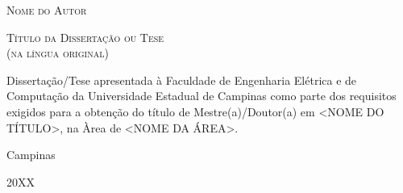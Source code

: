 \begin{center}

{\large\scshape Nome do Autor\par}

\vfill

{\large\scshape Título da Dissertação ou Tese\\(na língua original)\par}

%

\vfill

\end{center}

\hfill\parbox{0.45\linewidth}{
Dissertação/Tese apresentada à Faculdade de Engenharia Elétrica e de Computação da Universidade Estadual de Campinas como parte dos requisitos exigidos para a obtenção do título de Mestre(a)/Doutor(a) em <NOME DO TÍTULO>, na Àrea de <NOME DA ÁREA>.
}

\vfill


\begin{center}

Campinas

20XX

\end{center}
